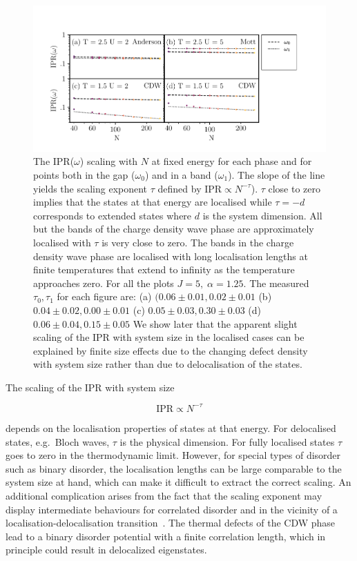 \hypertarget{fig:IPR_scaling}{%
\begin{figure}
\centering
\includegraphics[width=1\textwidth,height=\textheight]{figure_code/fk_chapter/DOS/IPR_scaling}
\caption[{Energy resolved DOS(\(\omega\)) and \(\tau\) (the scaling exponent of IPR(\(\omega\)) against system size \(N\)).}]{The IPR(\(\omega\)) scaling with \(N\) at fixed energy for each phase and for points both in the gap (\(\omega_0\)) and in a band (\(\omega_1\)). The slope of the line yields the scaling exponent \(\tau\) defined by \(\mathrm{IPR} \propto N^{-\tau}\)). \(\tau\) close to zero implies that the states at that energy are localised while \(\tau = -d\) corresponds to extended states where \(d\) is the system dimension. All but the bands of the charge density wave phase are approximately localised with \(\tau\) is very close to zero. The bands in the charge density wave phase are localised with long localisation lengths at finite temperatures that extend to infinity as the temperature approaches zero. For all the plots \(J = 5,\;\alpha = 1.25\). The measured \(\tau_0,\tau_1\) for each figure are: (a) \((0.06\pm0.01, 0.02\pm0.01\) (b) \(0.04\pm0.02, 0.00\pm0.01\) (c) \(0.05\pm0.03, 0.30\pm0.03\) (d) \(0.06\pm0.04, 0.15\pm0.05\) We show later that the apparent slight scaling of the IPR with system size in the localised cases can be explained by finite size effects due to the changing defect density with system size rather than due to delocalisation of the states.}
\label{fig:IPR_scaling}
\end{figure}
}

The scaling of the IPR with system size

\[\mathrm{IPR} \propto N^{-\tau}\]

depends on the localisation properties of states at that energy. For delocalised states, e.g.~Bloch waves, \(\tau\) is the physical dimension. For fully localised states \(\tau\) goes to zero in the thermodynamic limit. However, for special types of disorder such as binary disorder, the localisation lengths can be large comparable to the system size at hand, which can make it difficult to extract the correct scaling. An additional complication arises from the fact that the scaling exponent may display intermediate behaviours for correlated disorder and in the vicinity of a localisation-delocalisation transition~\autocite{kramerLocalizationTheoryExperiment1993,eversAndersonTransitions2008}. The thermal defects of the CDW phase lead to a binary disorder potential with a finite correlation length, which in principle could result in delocalized eigenstates.

